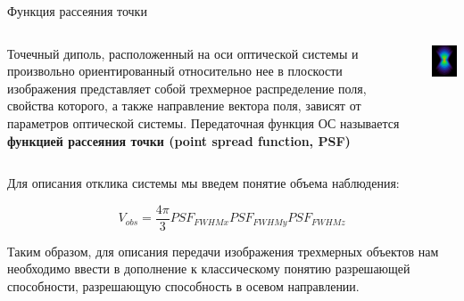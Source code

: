 \documentclass[9pt, compress, xcolor=table]{beamer}
\begin{document}
\begin{frame}{Функция рассеяния точки}

\begin{columns}[c]
\column{2.2in}

{\small Точечный диполь, расположенный на оси оптической системы и произвольно
ориентированный относительно нее в плоскости изображения представляет собой трехмерное
распределение поля, свойства которого, а также направление вектора поля, зависят от параметров
оптической системы. Передаточная функция ОС называется \textcolor{red!50!black}{\textbf{ функцией рассеяния точки (point spread function, PSF)}}}

\column{2.2in}
\begin{center}
\includegraphics[width=4cm]{fig4_24}
\end{center}
\end{columns}

Для описания отклика системы мы введем понятие объема наблюдения:

\begin{equation*}
V_{obs}= \frac{4\pi}{3}PSF_{FWHMx}PSF_{FWHMy}PSF_{FWHMz}
\end{equation*}

{\small Таким образом, для описания передачи изображения трехмерных объектов нам необходимо ввести в дополнение к классическому понятию разрешающей способности, разрешающую способность в осевом направлении.}
\end{frame}
\end{document}
